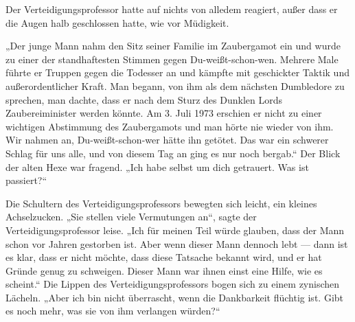 Der Verteidigungsprofessor hatte auf nichts von alledem reagiert, außer dass er die Augen halb geschlossen hatte, wie vor Müdigkeit.

„Der junge Mann nahm den Sitz seiner Familie im Zaubergamot ein und wurde zu einer der standhaftesten Stimmen gegen Du-weißt-schon-wen. Mehrere Male führte er Truppen gegen die Todesser an und kämpfte mit geschickter Taktik und außerordentlicher Kraft. Man begann, von ihm als dem nächsten Dumbledore zu sprechen, man dachte, dass er nach dem Sturz des Dunklen Lords Zaubereiminister werden könnte. Am 3. Juli 1973 erschien er nicht zu einer wichtigen Abstimmung des Zaubergamots und man hörte nie wieder von ihm. Wir nahmen an, Du-weißt-schon-wer hätte ihn getötet. Das war ein schwerer Schlag für uns alle, und von diesem Tag an ging es nur noch bergab.“ Der Blick der alten Hexe war fragend.
„Ich habe selbst um dich getrauert. Was ist passiert?“

Die Schultern des Verteidigungsprofessors bewegten sich leicht, ein kleines Achselzucken.
„Sie stellen viele Vermutungen an“, sagte der Verteidigungsprofessor leise.
„Ich für meinen Teil würde glauben, dass der Mann schon vor Jahren gestorben ist. Aber wenn dieser Mann dennoch lebt — dann ist es klar, dass er nicht möchte, dass diese Tatsache bekannt wird, und er hat Gründe genug zu schweigen. Dieser Mann war ihnen einst eine Hilfe, wie es scheint.“ Die Lippen des Verteidigungsprofessors bogen sich zu einem zynischen Lächeln.
„Aber ich bin nicht überrascht, wenn die Dankbarkeit flüchtig ist. Gibt es noch mehr, was sie von ihm verlangen würden?“

